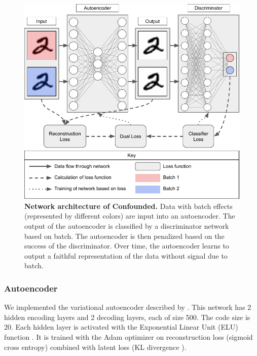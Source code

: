 \documentclass[11pt]{article}
\begin{document}
\begin{figure}
	\centering
	\includegraphics[width=\columnwidth]{figures/final/network.pdf}
	\caption[Network architecture of Confounded]{\textbf{Network architecture of Confounded.}
	Data with batch effects (represented by different colors) are input into an autoencoder.
	The output of the autoencoder is classified by a discriminator network based on batch.
	The autoencoder is then penalized based on the success of the discriminator.
	Over time, the autoencoder learns to output a faithful representation of the data without signal due to batch.}
	\label{fig:network}
\end{figure}

\subsubsection{Autoencoder}

We implemented the variational autoencoder \citep{louizos_variational_2015} described by \citet[Chapter 15]{geron_hands-machine_2017}.
This network has 2 hidden encoding layers and 2 decoding layers, each of size 500.
The code size is 20.
Each hidden layer is activated with the Exponential Linear Unit (ELU) function \citep{clevert_fast_2015}.
It is trained with the Adam optimizer \citep{kingma_adam_2014} on reconstruction loss (sigmoid cross entropy) combined with latent loss (KL divergence \citep{kullback_information_1951}).
\end{document}
